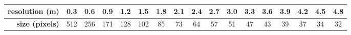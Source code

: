 \begin{tabular}{@{\hskip3pt}r@{\hskip3pt}|@{\hskip3pt}c@{\hskip3pt}@{\hskip3pt}c@{\hskip3pt}@{\hskip3pt}c@{\hskip3pt}@{\hskip3pt}c@{\hskip3pt}@{\hskip3pt}c@{\hskip3pt}@{\hskip3pt}c@{\hskip3pt}@{\hskip3pt}c@{\hskip3pt}@{\hskip3pt}c@{\hskip3pt}@{\hskip3pt}c@{\hskip3pt}@{\hskip3pt}c@{\hskip3pt}@{\hskip3pt}c@{\hskip3pt}@{\hskip3pt}c@{\hskip3pt}@{\hskip3pt}c@{\hskip3pt}@{\hskip3pt}c@{\hskip3pt}@{\hskip3pt}c@{\hskip3pt}@{\hskip3pt}c@{\hskip3pt}}
\textbf{resolution (m)} & 0.3 & 0.6 & 0.9 & 1.2 & 1.5 & 1.8 & 2.1 & 2.4 & 2.7 & 3.0 & 3.3 & 3.6 & 3.9 & 4.2 & 4.5 & 4.8 \\
\midrule
\textbf{size (pixels)} & 512 & 256 & 171 & 128 & 102 & 85 & 73 & 64 & 57 & 51 & 47 & 43 & 39 & 37 & 34 & 32 \\
\end{tabular}
